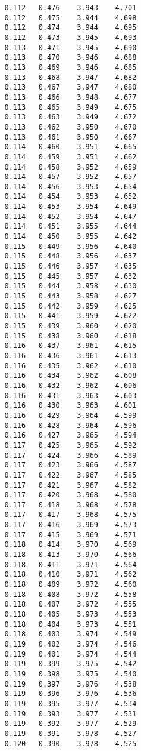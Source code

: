 \begin{verbatim}
   0.112   0.476    3.943    4.701
   0.112   0.475    3.944    4.698
   0.112   0.474    3.944    4.695
   0.112   0.473    3.945    4.693
   0.113   0.471    3.945    4.690
   0.113   0.470    3.946    4.688
   0.113   0.469    3.946    4.685
   0.113   0.468    3.947    4.682
   0.113   0.467    3.947    4.680
   0.113   0.466    3.948    4.677
   0.113   0.465    3.949    4.675
   0.113   0.463    3.949    4.672
   0.113   0.462    3.950    4.670
   0.113   0.461    3.950    4.667
   0.114   0.460    3.951    4.665
   0.114   0.459    3.951    4.662
   0.114   0.458    3.952    4.659
   0.114   0.457    3.952    4.657
   0.114   0.456    3.953    4.654
   0.114   0.454    3.953    4.652
   0.114   0.453    3.954    4.649
   0.114   0.452    3.954    4.647
   0.114   0.451    3.955    4.644
   0.114   0.450    3.955    4.642
   0.115   0.449    3.956    4.640
   0.115   0.448    3.956    4.637
   0.115   0.446    3.957    4.635
   0.115   0.445    3.957    4.632
   0.115   0.444    3.958    4.630
   0.115   0.443    3.958    4.627
   0.115   0.442    3.959    4.625
   0.115   0.441    3.959    4.622
   0.115   0.439    3.960    4.620
   0.115   0.438    3.960    4.618
   0.116   0.437    3.961    4.615
   0.116   0.436    3.961    4.613
   0.116   0.435    3.962    4.610
   0.116   0.434    3.962    4.608
   0.116   0.432    3.962    4.606
   0.116   0.431    3.963    4.603
   0.116   0.430    3.963    4.601
   0.116   0.429    3.964    4.599
   0.116   0.428    3.964    4.596
   0.116   0.427    3.965    4.594
   0.117   0.425    3.965    4.592
   0.117   0.424    3.966    4.589
   0.117   0.423    3.966    4.587
   0.117   0.422    3.967    4.585
   0.117   0.421    3.967    4.582
   0.117   0.420    3.968    4.580
   0.117   0.418    3.968    4.578
   0.117   0.417    3.968    4.575
   0.117   0.416    3.969    4.573
   0.117   0.415    3.969    4.571
   0.118   0.414    3.970    4.569
   0.118   0.413    3.970    4.566
   0.118   0.411    3.971    4.564
   0.118   0.410    3.971    4.562
   0.118   0.409    3.972    4.560
   0.118   0.408    3.972    4.558
   0.118   0.407    3.972    4.555
   0.118   0.405    3.973    4.553
   0.118   0.404    3.973    4.551
   0.118   0.403    3.974    4.549
   0.119   0.402    3.974    4.546
   0.119   0.401    3.974    4.544
   0.119   0.399    3.975    4.542
   0.119   0.398    3.975    4.540
   0.119   0.397    3.976    4.538
   0.119   0.396    3.976    4.536
   0.119   0.395    3.977    4.534
   0.119   0.393    3.977    4.531
   0.119   0.392    3.977    4.529
   0.119   0.391    3.978    4.527
   0.120   0.390    3.978    4.525

\end{verbatim}
